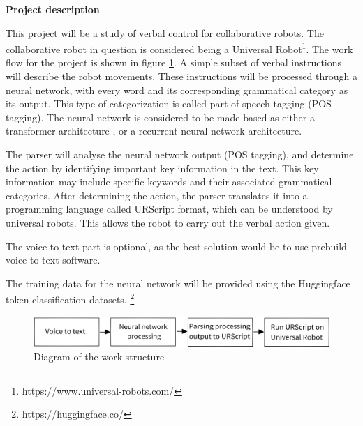 \textbf{\Large{Project description}}

This project will be a study of verbal control for collaborative 
robots. The collaborative robot in question is considered being a 
Universal Robot\footnote{https://www.universal-robots.com/}. 
The work flow for the project is shown in figure \ref{Diagram}. 
A simple subset of verbal instructions will describe the robot 
movements. These instructions will be processed through a neural network, 
with every word and its corresponding grammatical category as its 
output. This type of categorization is called part of speech 
tagging (POS tagging).
The neural network is considered to be made based as either a 
transformer architecture \cite{vaswani2017attention}\cite{devlin2018bert}, 
or a recurrent neural network architecture\cite{Method3}.

The parser will analyse the neural network output (POS tagging), and determine 
the action by identifying important key information in the text.
This key information may include specific keywords and their associated 
grammatical categories. After determining the action, the parser translates it 
into a programming language called URScript format, which can be understood 
by universal robots. This allows the robot to carry out the verbal action given.
\vspace{2mm}

The voice-to-text part is optional, as the best solution would be to use
prebuild voice to text software.
\vspace{2mm}

The training data for the neural network will be provided using 
the Huggingface token classification datasets. \footnote{https://huggingface.co/}
\vspace{2mm}
\vspace{2cm}
\begin{figure}[h]
    \centering
    \includegraphics[width=15cm]{img/Picture1.png}
    \caption{Diagram of the work structure}
    \label{Diagram}
\end{figure}



